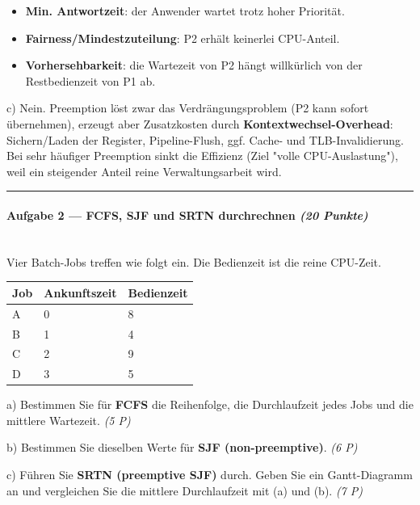 \documentclass[11pt, a4paper]{article}
\begin{document}
\begin{itemize}
  \item \textbf{Min. Antwortzeit}: der Anwender wartet trotz hoher Priorität.
  \item \textbf{Fairness/Mindestzuteilung}: P2 erhält keinerlei CPU-Anteil.
  \item \textbf{Vorhersehbarkeit}: die Wartezeit von P2 hängt willkürlich von der Restbedienzeit von P1 ab.
\end{itemize}

c) Nein. Preemption löst zwar das Verdrängungsproblem (P2 kann sofort übernehmen), erzeugt aber Zusatzkosten durch \textbf{Kontextwechsel-Overhead}: Sichern/Laden der Register, Pipeline-Flush, ggf. Cache- und TLB-Invalidierung. Bei sehr häufiger Preemption sinkt die Effizienz (Ziel "volle CPU-Auslastung"), weil ein steigender Anteil reine Verwaltungsarbeit wird.



\noindent\textcolor{rulegray}{\rule{\linewidth}{0.4pt}}


\paragraph{Aufgabe 2 — FCFS, SJF und SRTN durchrechnen \textit{(20 Punkte)}}\mbox{}\\[2pt]

Vier Batch-Jobs treffen wie folgt ein. Die Bedienzeit ist die reine CPU-Zeit.



{\small
\begin{tabularx}{\linewidth}{XXX}
\hline
\rowcolor{tableheadbg}
{\color{white}\textbf{Job}} & {\color{white}\textbf{Ankunftszeit}} & {\color{white}\textbf{Bedienzeit}} \\[2pt]
\hline
\endhead
\hline
\endfoot
A & 0 & 8 \\
B & 1 & 4 \\
C & 2 & 9 \\
D & 3 & 5 \\
\end{tabularx}
}


a) Bestimmen Sie für \textbf{FCFS} die Reihenfolge, die Durchlaufzeit jedes Jobs und die mittlere Wartezeit. \textit{(5 P)}


b) Bestimmen Sie dieselben Werte für \textbf{SJF (non-preemptive)}. \textit{(6 P)}


c) Führen Sie \textbf{SRTN (preemptive SJF)} durch. Geben Sie ein Gantt-Diagramm an und vergleichen Sie die mittlere Durchlaufzeit mit (a) und (b). \textit{(7 P)}
\end{document}
